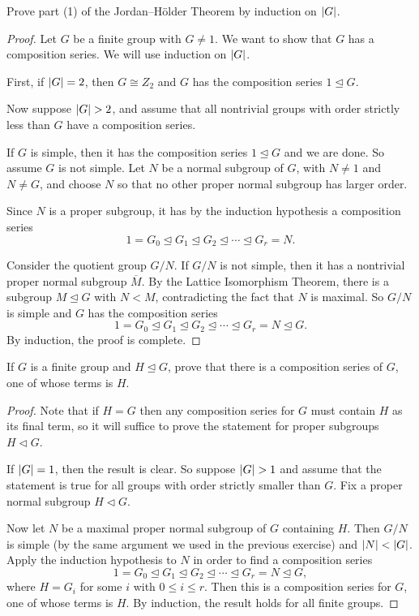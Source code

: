  Prove part (1) of the Jordan--H\"older Theorem by induction
on $\lvert{G}\rvert$.
\begin{proof}
  Let $G$ be a finite group with $G\neq1$. We want to show that $G$
  has a composition series. We will use induction on $\lvert{G}\rvert$.

  First, if $\lvert{G}\rvert = 2$, then $G\cong Z_2$ and $G$ has the
  composition series $1\trianglelefteq G$.

  Now suppose $\lvert{G}\rvert > 2$, and assume that all nontrivial groups
  with order strictly less than $G$ have a composition series.

  If $G$ is simple, then it has the composition series
  $1\trianglelefteq G$ and we are done. So assume $G$ is not
  simple. Let $N$ be a normal subgroup of $G$, with $N\neq1$ and
  $N\neq G$, and choose $N$ so that no other proper normal subgroup
  has larger order.

  Since $N$ is a proper subgroup, it has by the induction hypothesis a
  composition series
  \begin{equation*}
    1 = G_0 \trianglelefteq G_1 \trianglelefteq
    G_2 \trianglelefteq\cdots\trianglelefteq
    G_r = N.
  \end{equation*}

  Consider the quotient group $G/N$. If $G/N$ is not simple, then it
  has a nontrivial proper normal subgroup $\overline{M}$. By the
  Lattice Isomorphism Theorem, there is a subgroup
  $M\trianglelefteq G$ with $N<M$, contradicting the fact that $N$ is
  maximal. So $G/N$ is simple and $G$ has the composition series
  \begin{equation*}
    1 = G_0 \trianglelefteq G_1 \trianglelefteq
    G_2 \trianglelefteq\cdots\trianglelefteq
    G_r = N \trianglelefteq G.
  \end{equation*}
  By induction, the proof is complete.
\end{proof}

 If $G$ is a finite group and $H\trianglelefteq G$, prove
that there is a composition series of $G$, one of whose terms is $H$.
\begin{proof}
  Note that if $H = G$ then any composition series for $G$ must
  contain $H$ as its final term, so it will suffice to prove the
  statement for proper subgroups $H\triangleleft G$.

  If $\lvert{G}\rvert = 1$, then the result is clear. So suppose $\lvert{G}\rvert > 1$
  and assume that the statement is true for all groups with order
  strictly smaller than $G$. Fix a proper normal subgroup
  $H\triangleleft G$.

  Now let $N$ be a maximal proper normal subgroup of $G$ containing
  $H$. Then $G/N$ is simple (by the same argument we used in the
  previous exercise) and $\lvert{N}\rvert < \lvert{G}\rvert$. Apply the induction
  hypothesis to $N$ in order to find a composition series
  \begin{equation*}
    1 = G_0 \trianglelefteq
    G_1 \trianglelefteq
    G_2 \trianglelefteq\cdots\trianglelefteq
    G_r = N \trianglelefteq G,
  \end{equation*}
  where $H = G_i$ for some $i$ with $0\leq i\leq r$. Then this is a
  composition series for $G$, one of whose terms is $H$. By induction,
  the result holds for all finite groups.
\end{proof}
